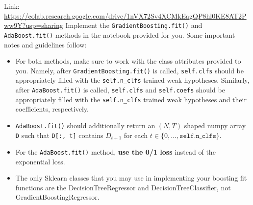 \begin{problem}[14]
    Link: \url{https://colab.research.google.com/drive/1nVX72Sv4XCMkEagQP8hl0KE8AT2Pww9Y?usp=sharing}
    Implement the \texttt{GradientBoosting.fit()} and \texttt{AdaBoost.fit()} methods in the notebook provided for you. Some important notes and guidelines follow:
    \begin{itemize}
        \item For both methods, make sure to work with the class attributes provided to you. Namely, after \texttt{GradientBoosting.fit()} is called, \texttt{self.clfs} should be appropriately filled with the \texttt{self.n_clfs} trained weak hypotheses. Similarly, after \texttt{AdaBoost.fit()} is called, \texttt{self.clfs} and \texttt{self.coefs} should be appropriately filled with the \texttt{self.n_clfs} trained weak hypotheses and their coefficients, respectively.
        \item \texttt{AdaBoost.fit()} should additionally return an $(N, T)$ shaped numpy array \texttt{D} such that \texttt{D[:, t]} contains $D_{t+1}$ for each $t \in \{0, \ldots, \texttt{self.n_clfs}\}$.
        \item For the \texttt{AdaBoost.fit()} method, \textbf{use the 0/1 loss} instead of the exponential loss.
	\item The only Sklearn classes that you may use in implementing your boosting fit functions are the DecisionTreeRegressor and DecisionTreeClassifier, not GradientBoostingRegressor.
    \end{itemize}
\end{problem}

